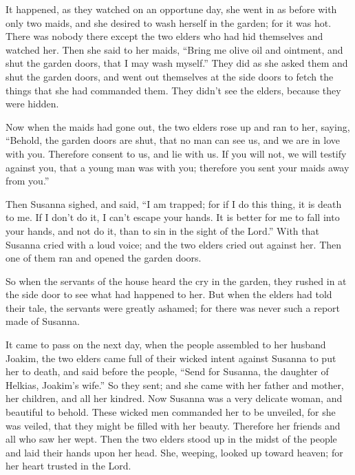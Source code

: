  It happened, as they watched on an opportune day, she
went in as before with only two maids, and she desired to wash herself
in the garden; for it was hot.  There was nobody there
except the two elders who had hid themselves and watched her.
 Then she said to her maids, ``Bring me olive oil and
ointment, and shut the garden doors, that I may wash myself.''
 They did as she asked them and shut the garden doors,
and went out themselves at the side doors to fetch the things that she
had commanded them. They didn't see the elders, because they were
hidden.

 Now when the maids had gone out, the two elders rose up
and ran to her, saying,  ``Behold, the garden doors are
shut, that no man can see us, and we are in love with you. Therefore
consent to us, and lie with us.  If you will not, we will
testify against you, that a young man was with you; therefore you sent
your maids away from you.''

 Then Susanna sighed, and said, ``I am trapped; for if I
do this thing, it is death to me. If I don't do it, I can't escape your
hands.  It is better for me to fall into your hands, and
not do it, than to sin in the sight of the Lord.''  With
that Susanna cried with a loud voice; and the two elders cried out
against her.  Then one of them ran and opened the garden
doors.

 So when the servants of the house heard the cry in the
garden, they rushed in at the side door to see what had happened to her.
 But when the elders had told their tale, the servants
were greatly ashamed; for there was never such a report made of Susanna.

 It came to pass on the next day, when the people
assembled to her husband Joakim, the two elders came full of their
wicked intent against Susanna to put her to death,  and
said before the people, ``Send for Susanna, the daughter of Helkias,
Joakim's wife.'' So they sent;  and she came with her
father and mother, her children, and all her kindred. 
Now Susanna was a very delicate woman, and beautiful to behold.
 These wicked men commanded her to be unveiled, for she
was veiled, that they might be filled with her beauty. 
Therefore her friends and all who saw her wept.  Then the
two elders stood up in the midst of the people and laid their hands upon
her head.  She, weeping, looked up toward heaven; for her
heart trusted in the Lord.

